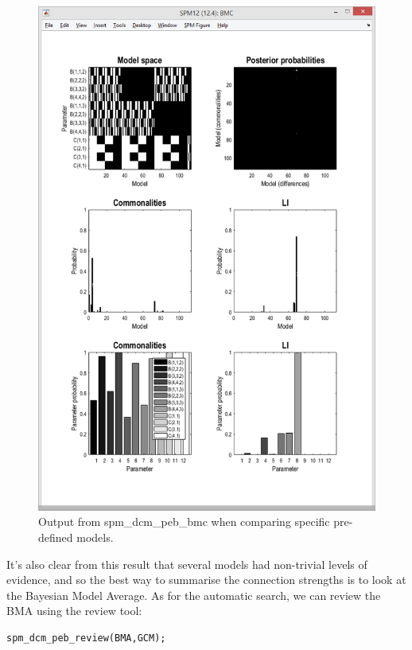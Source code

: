 \documentclass{article}
\begin{document}
\begin{figure}[ht]
\begin{center}
\includegraphics{"Fig_peb_specific_models_bmc"}
\caption{Output from spm\_dcm\_peb\_bmc when comparing specific pre-defined models.\label{Fig_peb_specific_models_bmc}}
\end{center}
\end{figure}

It's also clear from this result that several models had non-trivial levels of evidence, and so the best way to summarise the connection strengths is to look at the Bayesian Model Average. As for the automatic search, we can review the BMA using the review tool:

\begin{lstlisting}[style=Matlab-editor,caption=PEB review tool]
% Review the BMA
spm_dcm_peb_review(BMA,GCM);
\end{lstlisting}
\end{document}
